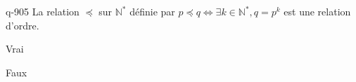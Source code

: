 \begin{truefalse}{q-905}
La relation $\preccurlyeq$ sur $\mathbb N^*$ définie par $p\preccurlyeq q \iff \exists k\in\mathbb N^*,q=p^k$ est une relation d'ordre.
\item* Vrai
\item Faux
\end{truefalse}

